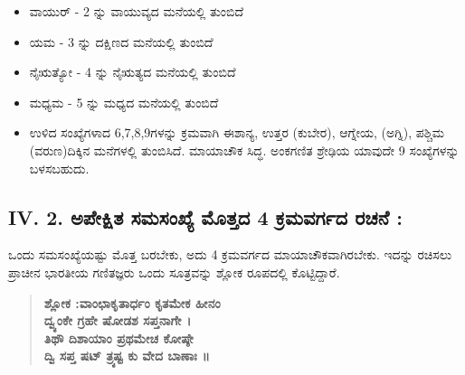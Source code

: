 \begin{itemize}
\begin{figure}[H]
	\end{figure}
	\item ವಾಯುರ್ - 2 ನ್ನು ವಾಯುವ್ಯದ ಮನೆಯಲ್ಲಿ ತುಂಬಿದೆ
	\item ಯಮ - 3 ನ್ನು ದಕ್ಷಿಣದ ಮನೆಯಲ್ಲಿ ತುಂಬಿದೆ
	\item ನೈಋತ್ಯೋ - 4 ನ್ನು ನೈಋತ್ಯದ ಮನೆಯಲ್ಲಿ ತುಂಬಿದೆ
	\item ಮಧ್ಯಮ - 5 ನ್ನು ಮಧ್ಯದ ಮನೆಯಲ್ಲಿ ತುಂಬಿದೆ
	\item ಉಳಿದ ಸಂಖ್ಯೆಗಳಾದ 6,7,8,9ಗಳನ್ನು ಕ್ರಮವಾಗಿ ಈಶಾನ್ಯ, ಉತ್ತರ (ಕುಬೇರ), ಆಗ್ನೇಯ, (ಅಗ್ನಿ), ಪಶ್ಚಿಮ (ವರುಣ)ದಿಕ್ಕಿನ ಮನೆಗಳಲ್ಲಿ ತುಂಬಿಸಿದೆ. ಮಾಯಾಚೌಕ ಸಿದ್ಧ. ಅಂಕಗಣಿತ ಶ್ರೇಢಿಯ ಯಾವುದೇ 9 ಸಂಖ್ಯೆಗಳನ್ನು ಬಳಸಬಹುದು.
\end{itemize}

\subsection*{IV. 2. ಅಪೇಕ್ಷಿತ ಸಮಸಂಖ್ಯೆ ಮೊತ್ತದ 4 ಕ್ರಮವರ್ಗದ ರಚನೆ :}

ಒಂದು ಸಮಸಂಖ್ಯೆಯಷ್ಟು ಮೊತ್ತ ಬರಬೇಕು, ಅದು 4 ಕ್ರಮವರ್ಗದ ಮಾಯಾಚೌಕವಾಗಿರಬೇಕು. ಇದನ್ನು ರಚಿಸಲು ಪ್ರಾಚೀನ ಭಾರತೀಯ ಗಣಿತಜ್ಞರು ಒಂದು ಸೂತ್ರವನ್ನು ಶ್ಲೋಕ ರೂಪದಲ್ಲಿ ಕೊಟ್ಟಿದ್ದಾರೆ.
\begin{quote}
\textbf{ಶ್ಲೋಕ :ವಾಂಛಾಕೃತಾರ್ಧಂ ಕೃತಮೇಕ ಹೀನಂ}\\
\textbf{ದ್ವ್ಯಂಕೇ ಗ್ರಹೇ ಷೋಡಶ ಸಪ್ತನಾಗೇ ।}\\
\textbf{ತಿಥೌ ದಿಶಾಯಾಂ ಪ್ರಥಮೇಚ ಕೋಷ್ಠೇ}\\
\textbf{ದ್ವಿ ಸಪ್ತ ಷಟ್ ತ್ರ್ಯಷ್ಟ ಕು ವೇದ ಬಾಣಾಃ ॥}
\end{quote}

